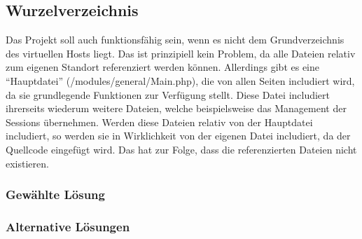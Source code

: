 \subsection{Wurzelverzeichnis}
Das Projekt soll auch funktionsfähig sein, wenn es nicht dem Grundverzeichnis des virtuellen Hosts liegt. Das ist prinzipiell kein Problem, da alle Dateien relativ zum eigenen Standort referenziert werden können. Allerdings gibt es eine \enquote{Hauptdatei} (/modules/general/Main.php), die von allen Seiten includiert wird, da sie grundlegende Funktionen zur Verfügung stellt. Diese Datei includiert ihrerseits wiederum weitere Dateien, welche beispielsweise das Management der Sessions übernehmen. Werden diese Dateien relativ von der Hauptdatei  includiert, so werden sie in Wirklichkeit von der eigenen Datei includiert, da der Quellcode eingefügt wird. Das hat zur Folge, dass die referenzierten Dateien nicht existieren.

\subsubsection{Gewählte Lösung}


\subsubsection{Alternative Lösungen}